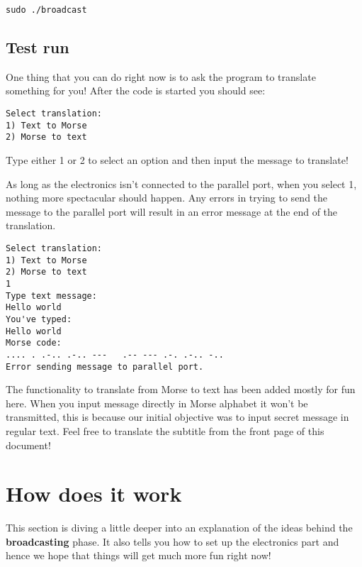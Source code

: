 \documentclass[12pt]{report}
\begin{document}
\begin{snugshade}
\verb|sudo ./broadcast|
\end{snugshade}

\subsection{Test run}

One thing that you can do right now is to ask the program to translate something for you! After the code is started you should see:

\begin{snugshade}
\begin{verbatim}
Select translation:
1) Text to Morse
2) Morse to text
\end{verbatim}
\end{snugshade}

Type either 1 or 2 to select an option and then input the message to translate!

As long as the electronics isn't connected to the parallel port, when you select 1, nothing more spectacular should happen. Any errors in trying to send the message to the parallel port will result in an error message at the end of the translation.

\begin{snugshade}
\begin{verbatim}
Select translation:
1) Text to Morse
2) Morse to text
1
Type text message:
Hello world
You've typed: 
Hello world
Morse code: 
.... . .-.. .-.. ---   .-- --- .-. .-.. -.. 
Error sending message to parallel port.
\end{verbatim}
\end{snugshade}

The functionality to translate from Morse to text has been added mostly for fun here. When you input message directly in Morse alphabet it won't be transmitted, this is because our initial objective was to input secret message in regular text. Feel free to translate the subtitle from the front page of this document!

\section{How does it work} \label{sec:howB}

This section is diving a little deeper into an explanation of the ideas behind the \textbf{broadcasting} phase. It also tells you how to set up the electronics part and hence we hope that things will get much more fun right now!
\end{document}
